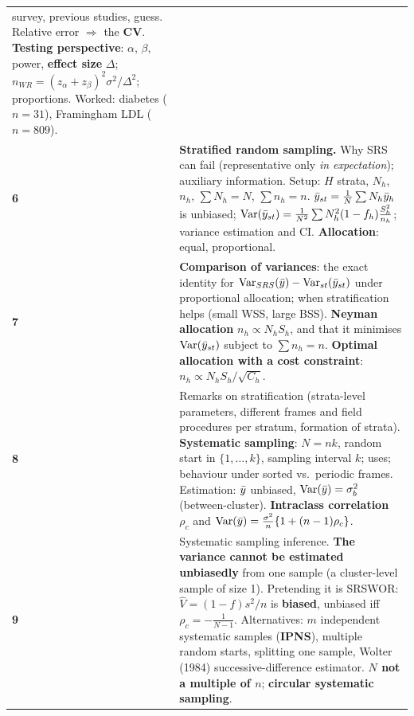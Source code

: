 \begin{center}
\begin{longtable}{@{}p{1.4cm}p{13.4cm}@{}}
{survey}, previous studies, guess. Relative error $\Rightarrow$ the \textbf{CV}. \textbf{Testing
perspective}: $\alpha$, $\beta$, power, \textbf{effect size} $\Delta$;
$n_{WR}=(z_\alpha+z_\beta)^2\sigma^2/\Delta^2$; proportions. Worked: diabetes ($n=31$),
Framingham LDL ($n=809$). \\[2pt]
\textbf{6} &
\textbf{Stratified random sampling.} Why SRS can fail (representative only \emph{in
expectation}); auxiliary information. Setup: $H$ strata, $N_h$, $n_h$, $\sum N_h=N$,
$\sum n_h=n$. $\bar{y}_{st}=\frac1N\sum N_h\bar{y}_h$ is unbiased;
$\operatorname{Var}(\bar{y}_{st})=\frac1{N^2}\sum N_h^2(1-f_h)\frac{S_h^2}{n_h}$; variance estimation and CI.
\textbf{Allocation}: equal, proportional. \\[2pt]
\textbf{7} &
\textbf{Comparison of variances}: the exact identity for
$\operatorname{Var}_{SRS}(\bar{y})-\operatorname{Var}_{st}(\bar{y}_{st})$ under proportional allocation; when stratification
helps (small WSS, large BSS). \textbf{Neyman allocation} $n_h\propto N_hS_h$, and that it
minimises $\operatorname{Var}(\bar{y}_{st})$ subject to $\sum n_h=n$. \textbf{Optimal allocation with a cost
constraint}: $n_h\propto N_hS_h/\sqrt{C_h}$. \\[2pt]
\textbf{8} &
Remarks on stratification (strata-level parameters, different frames and field procedures per
stratum, formation of strata). \textbf{Systematic sampling}: $N=nk$, random start in
$\{1,\dots,k\}$, sampling interval $k$; uses; behaviour under sorted vs.\ periodic frames.
Estimation: $\bar{y}$ unbiased, $\operatorname{Var}(\bar{y})=\sigma_b^2$ (between-cluster).
\textbf{Intraclass correlation} $\rho_c$ and
$\operatorname{Var}(\bar{y})=\frac{\sigma^2}{n}\{1+(n-1)\rho_c\}$. \\[2pt]
\textbf{9} &
Systematic sampling inference. \textbf{The variance cannot be estimated unbiasedly} from one
sample (a cluster-level sample of size 1). Pretending it is SRSWOR: $\hat V=(1-f)s^2/n$ is
\textbf{biased}, unbiased iff $\rho_c=-\frac1{N-1}$. Alternatives: $m$ independent systematic
samples (\textbf{IPNS}), multiple random starts, splitting one sample, Wolter (1984)
successive-difference estimator. \textbf{$N$ not a multiple of $n$}; \textbf{circular systematic
sampling}. \\
\bottomrule
\end{longtable}
\end{center}

